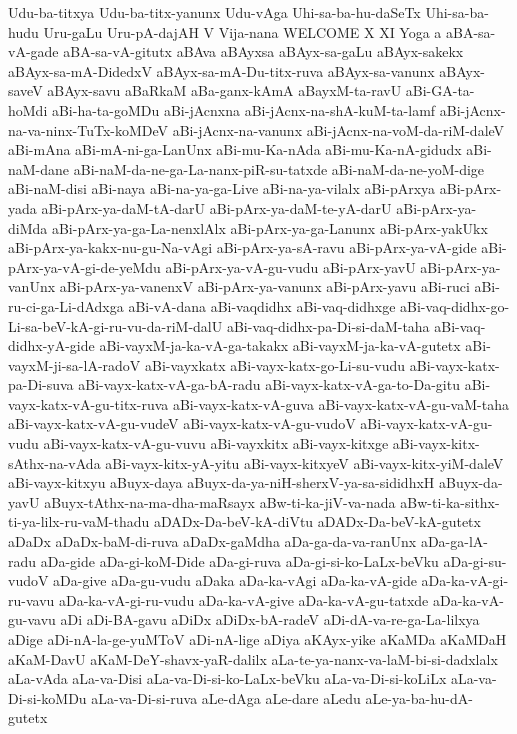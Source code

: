 {Udu-ba-titxya
Udu-ba-titx-yanunx
Udu-vAga
Uhi-sa-ba-hu-daSeTx
Uhi-sa-ba-hudu
Uru-gaLu
Uru-pA-dajAH
V
Vija-nana
WELCOME
X
XI
Yoga
a
aBA-sa-vA-gade
aBA-sa-vA-gitutx
aBAva
aBAyxsa
aBAyx-sa-gaLu
aBAyx-sakekx
aBAyx-sa-mA-DidedxV
aBAyx-sa-mA-Du-titx-ruva
aBAyx-sa-vanunx
aBAyx-saveV
aBAyx-savu
aBaRkaM
aBa-ganx-kAmA
aBayxM-ta-ravU
aBi-GA-ta-hoMdi
aBi-ha-ta-goMDu
aBi-jAcnxna
aBi-jAcnx-na-shA-kuM-ta-lamf
aBi-jAcnx-na-va-ninx-TuTx-koMDeV
aBi-jAcnx-na-vanunx
aBi-jAcnx-na-voM-da-riM-daleV
aBi-mAna
aBi-mA-ni-ga-LanUnx
aBi-mu-Ka-nAda
aBi-mu-Ka-nA-gidudx
aBi-naM-dane
aBi-naM-da-ne-ga-La-nanx-piR-su-tatxde
aBi-naM-da-ne-yoM-dige
aBi-naM-disi
aBi-naya
aBi-na-ya-ga-Live
aBi-na-ya-vilalx
aBi-pArxya
aBi-pArx-yada
aBi-pArx-ya-daM-tA-darU
aBi-pArx-ya-daM-te-yA-darU
aBi-pArx-ya-diMda
aBi-pArx-ya-ga-La-nenxlAlx
aBi-pArx-ya-ga-Lanunx
aBi-pArx-yakUkx
aBi-pArx-ya-kakx-nu-gu-Na-vAgi
aBi-pArx-ya-sA-ravu
aBi-pArx-ya-vA-gide
aBi-pArx-ya-vA-gi-de-yeMdu
aBi-pArx-ya-vA-gu-vudu
aBi-pArx-yavU
aBi-pArx-ya-vanUnx
aBi-pArx-ya-vanenxV
aBi-pArx-ya-vanunx
aBi-pArx-yavu
aBi-ruci
aBi-ru-ci-ga-Li-dAdxga
aBi-vA-dana
aBi-vaqdidhx
aBi-vaq-didhxge
aBi-vaq-didhx-go-Li-sa-beV-kA-gi-ru-vu-da-riM-dalU
aBi-vaq-didhx-pa-Di-si-daM-taha
aBi-vaq-didhx-yA-gide
aBi-vayxM-ja-ka-vA-ga-takakx
aBi-vayxM-ja-ka-vA-gutetx
aBi-vayxM-ji-sa-lA-radoV
aBi-vayxkatx
aBi-vayx-katx-go-Li-su-vudu
aBi-vayx-katx-pa-Di-suva
aBi-vayx-katx-vA-ga-bA-radu
aBi-vayx-katx-vA-ga-to-Da-gitu
aBi-vayx-katx-vA-gu-titx-ruva
aBi-vayx-katx-vA-guva
aBi-vayx-katx-vA-gu-vaM-taha
aBi-vayx-katx-vA-gu-vudeV
aBi-vayx-katx-vA-gu-vudoV
aBi-vayx-katx-vA-gu-vudu
aBi-vayx-katx-vA-gu-vuvu
aBi-vayxkitx
aBi-vayx-kitxge
aBi-vayx-kitx-sAthx-na-vAda
aBi-vayx-kitx-yA-yitu
aBi-vayx-kitxyeV
aBi-vayx-kitx-yiM-daleV
aBi-vayx-kitxyu
aBuyx-daya
aBuyx-da-ya-niH-sherxV-ya-sa-sididhxH
aBuyx-da-yavU
aBuyx-tAthx-na-ma-dha-maRsayx
aBw-ti-ka-jiV-va-nada
aBw-ti-ka-sithx-ti-ya-lilx-ru-vaM-thadu
aDADx-Da-beV-kA-diVtu
aDADx-Da-beV-kA-gutetx
aDaDx
aDaDx-baM-di-ruva
aDaDx-gaMdha
aDa-ga-da-va-ranUnx
aDa-ga-lA-radu
aDa-gide
aDa-gi-koM-Dide
aDa-gi-ruva
aDa-gi-si-ko-LaLx-beVku
aDa-gi-su-vudoV
aDa-give
aDa-gu-vudu
aDaka
aDa-ka-vAgi
aDa-ka-vA-gide
aDa-ka-vA-gi-ru-vavu
aDa-ka-vA-gi-ru-vudu
aDa-ka-vA-give
aDa-ka-vA-gu-tatxde
aDa-ka-vA-gu-vavu
aDi
aDi-BA-gavu
aDiDx
aDiDx-bA-radeV
aDi-dA-va-re-ga-La-lilxya
aDige
aDi-nA-la-ge-yuMToV
aDi-nA-lige
aDiya
aKAyx-yike
aKaMDa
aKaMDaH
aKaM-DavU
aKaM-DeY-shavx-yaR-dalilx
aLa-te-ya-nanx-va-laM-bi-si-dadxlalx
aLa-vAda
aLa-va-Disi
aLa-va-Di-si-ko-LaLx-beVku
aLa-va-Di-si-koLiLx
aLa-va-Di-si-koMDu
aLa-va-Di-si-ruva
aLe-dAga
aLe-dare
aLedu
aLe-ya-ba-hu-dA-gutetx
}
